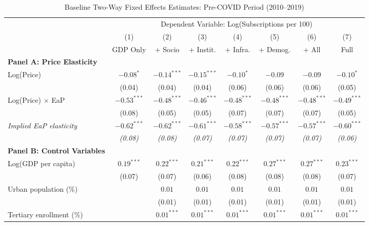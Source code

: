 \begin{table}[H]
\centering
\caption{Baseline Two-Way Fixed Effects Estimates: Pre-COVID Period (2010--2019)}
\label{tab:baseline}
\begin{minipage}{\textwidth}
\begin{adjustbox}{width=\textwidth}
\scriptsize
\setlength{\tabcolsep}{3pt}
\renewcommand{\arraystretch}{0.85}
\begin{tabular}{@{}lccccccc@{}}
\toprule
& \multicolumn{7}{c}{Dependent Variable: Log(Subscriptions per 100)} \\
\cmidrule(lr){2-8}
& (1) & (2) & (3) & (4) & (5) & (6) & (7) \\
& GDP Only & + Socio & + Instit. & + Infra. & + Demog. & + All & Full \\
\midrule
\textbf{Panel A: Price Elasticity} \\
Log(Price) & $-0.08^{*}$ & $-0.14^{***}$ & $-0.15^{***}$ & $-0.10^{*}$ & $-0.09$ & $-0.09$ & $-0.10^{*}$ \\
& (0.04) & (0.04) & (0.04) & (0.06) & (0.06) & (0.06) & (0.05) \\[2pt]
Log(Price) $\times$ EaP & $-0.53^{***}$ & $-0.48^{***}$ & $-0.46^{***}$ & $-0.48^{***}$ & $-0.48^{***}$ & $-0.48^{***}$ & $-0.49^{***}$ \\
& (0.08) & (0.05) & (0.05) & (0.07) & (0.07) & (0.07) & (0.05) \\[2pt]
\textit{Implied EaP elasticity} & \textit{$-0.62^{***}$} & \textit{$-0.62^{***}$} & \textit{$-0.61^{***}$} & \textit{$-0.58^{***}$} & \textit{$-0.57^{***}$} & \textit{$-0.57^{***}$} & \textit{$-0.60^{***}$} \\
& \textit{(0.08)} & \textit{(0.08)} & \textit{(0.07)} & \textit{(0.07)} & \textit{(0.07)} & \textit{(0.07)} & \textit{(0.06)} \\[2pt]
\midrule
\textbf{Panel B: Control Variables} \\
Log(GDP per capita) & $0.19^{***}$ & $0.22^{***}$ & $0.21^{***}$ & $0.22^{***}$ & $0.27^{***}$ & $0.27^{***}$ & $0.23^{***}$ \\
& (0.07) & (0.07) & (0.06) & (0.08) & (0.08) & (0.08) & (0.07) \\[2pt]
Urban population (\%) &  & $0.01$ & $0.01$ & $0.01$ & $0.01$ & $0.01$ & $0.01$ \\
&  & (0.01) & (0.01) & (0.01) & (0.01) & (0.01) & (0.01) \\[2pt]
Tertiary enrollment (\%) &  & $0.01^{***}$ & $0.01^{***}$ & $0.01^{***}$ & $0.01^{***}$ & $0.01^{***}$ & $0.01^{***}$ \\

\end{tabular}
\end{adjustbox}
\end{minipage}
\end{table}
